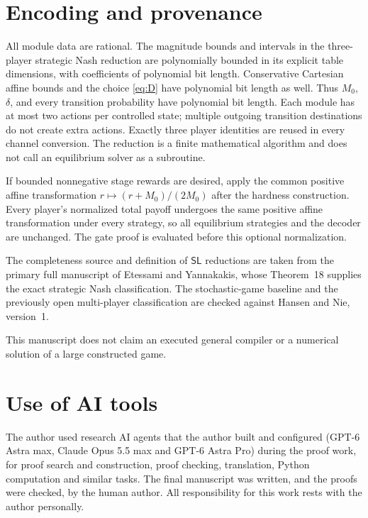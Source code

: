 \documentclass[11pt,a4paper]{article}
\numberwithin{equation}{section}
\theoremstyle{definition}
\newcommand{\SL}{\mathsf{SL}}
\begin{document}
\section{Encoding and provenance}\label{sec:scope}

All module data are rational. The magnitude bounds and intervals in
the three-player strategic Nash reduction are polynomially bounded
in its explicit table dimensions, with coefficients of polynomial bit
length. Conservative Cartesian affine bounds and the choice
\eqref{eq:D} have polynomial bit length as well. Thus \(M_0\),
\(\delta\), and every transition probability have polynomial bit
length. Each module has at most two actions per controlled state;
multiple outgoing transition destinations do not create extra actions.
Exactly three player identities are reused in every channel conversion.
The reduction is a finite mathematical algorithm and does not call an
equilibrium solver as a subroutine.

If bounded nonnegative stage rewards are desired, apply the common
positive affine transformation \(r\mapsto(r+M_0)/(2M_0)\) after the
hardness construction. Every player's normalized total payoff undergoes
the same positive affine transformation under every strategy, so all
equilibrium strategies and the decoder are unchanged. The gate proof
is evaluated before this optional normalization.

The completeness source and definition of \(\SL\) reductions are
taken from the primary full manuscript of Etessami and Yannakakis,
whose Theorem~18 supplies the exact strategic Nash classification.
The stochastic-game baseline and the previously open multi-player
classification are checked against Hansen and Nie, version~1.

This manuscript does not claim an executed general compiler or a
numerical solution of a large constructed game.

\section*{Use of AI tools}
The author used research AI agents that the author built and configured (GPT-6 Astra max,
Claude Opus 5.5 max and GPT-6 Astra Pro) during the proof work, for proof search and
construction, proof checking, translation, Python computation and similar tasks. The final
manuscript was written, and the proofs were checked, by the human author. All responsibility
for this work rests with the author personally.
\end{document}

